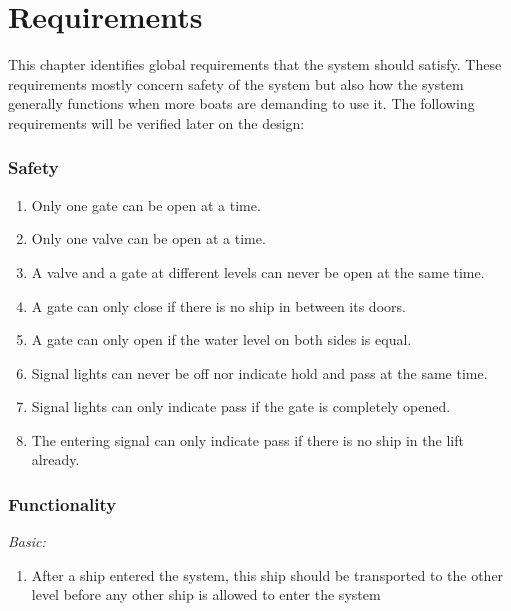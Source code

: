 \section{Requirements}
This chapter identifies global requirements that the system should satisfy. These requirements mostly concern safety of the system but also how the system generally functions when more boats are demanding to use it. The following requirements will be verified later on the design:

\subsubsection*{Safety}
\begin{enumerate}
	\item Only one gate can be open at a time.
	\item Only one valve can be open at a time.
	\item A valve and a gate at different levels can never be open at the same time.
	\item A gate can only close if there is no ship in between its doors.
	\item A gate can only open if the water level on both sides is equal.
	\item Signal lights can never be off nor indicate hold and pass at the same time.
	\item Signal lights can only indicate pass if the gate is completely opened.
	\item The entering signal can only indicate pass if there is no ship in the lift already.
\end{enumerate}

\subsubsection*{Functionality}
\textit{Basic:}
\begin{enumerate}
	\item After a ship entered the system, this ship should be transported to the other level before any other ship is allowed to enter the system
\end{enumerate}
